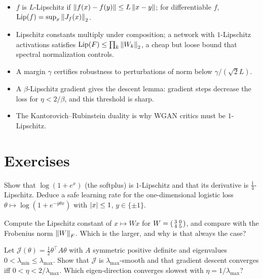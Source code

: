 \begin{notechapter}
\begin{chaptersummary}
\begin{itemize}[nosep]
  \item $f$ is $L$-Lipschitz if $\left\|f(x)-f(y)\right\|\leq L\left\|x-y\right\|$; for
        differentiable $f$, $\mathrm{Lip}(f) = \sup_x\left\|J_f(x)\right\|_2$.
  \item Lipschitz constants multiply under composition; a network with
        $1$-Lipschitz activations satisfies
        $\mathrm{Lip}(F)\leq\prod_k\left\|W_k\right\|_2$, a cheap but loose bound
        that spectral normalization controls.
  \item A margin $\gamma$ certifies robustness to perturbations of norm below
        $\gamma/(\sqrt2L)$.
  \item A $\beta$-Lipschitz gradient gives the descent lemma: gradient steps
        decrease the loss for $\eta<2/\beta$, and this threshold is sharp.
  \item The Kantorovich--Rubinstein duality is why WGAN critics must be
        $1$-Lipschitz.
\end{itemize}
\end{chaptersummary}

\section*{Exercises}

\begin{exercise}\label{lipschitz-continuity:exr:1}
Show that $\log(1 + e^{x})$ (the softplus) is $1$-Lipschitz and that its
derivative is $\frac14$-Lipschitz. Deduce a safe learning rate for the
one-dimensional logistic loss $\theta\mapsto\log(1 + e^{-y\theta x})$ with
$\left|x\right|\leq 1$, $y\in\{\pm1\}$.
\end{exercise}

\begin{exercise}\label{lipschitz-continuity:exr:2}
Compute the Lipschitz constant of $x\mapsto Wx$ for
$W = \begin{psmallmatrix}3 & 0\\ 4 & 5\end{psmallmatrix}$, and compare with
the Frobenius norm $\left\|W\right\|_F$. Which is the larger, and why is that always the
case?
\end{exercise}

\begin{exercise}\label{lipschitz-continuity:exr:3}
Let $\mathcal J(\theta) = \frac12\theta^\top A\theta$ with $A$ symmetric
positive definite and eigenvalues $0<\lambda_{\min}\leq\lambda_{\max}$. Show that
$\mathcal J$ is $\lambda_{\max}$-smooth and that gradient descent converges iff
$0<\eta<2/\lambda_{\max}$. Which eigen-direction converges slowest with
$\eta = 1/\lambda_{\max}$?
\end{exercise}
\end{notechapter}
